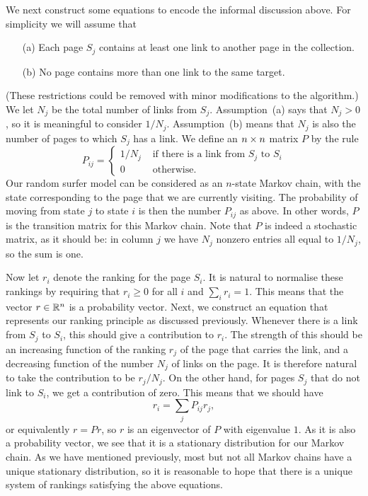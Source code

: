 \documentclass[reqno]{amsart}
\theoremstyle{definition}
\newcommand{\idx}[1]{{#1}\index{#1}}
\begin{document}
We next construct some equations to encode the informal discussion
above.  For simplicity we will assume that 
\begin{itemize}
 \item[(a)] Each page $S_j$ contains at least one link to another page
  in the collection.
 \item[(b)] No page contains more than one link to the same target.
\end{itemize}
(These restrictions could be removed with minor modifications to the
algorithm.)  We let $N_j$ be the total number of links from $S_j$.
Assumption~(a) says that $N_j>0$, so it is meaningful to consider
$1/N_j$.  Assumption~(b) means that $N_j$ is also the number of pages
to which $S_j$ has a link.  We define an $n\times n$ matrix $P$ by the
rule 
\[ P_{ij} = \begin{cases}
     1/N_j & \text{ if there is a link from $S_j$ to $S_i$} \\
     0     & \text{ otherwise. } 
   \end{cases}
\]
Our random surfer model can be considered as an $n$-state Markov
chain, with the state corresponding to the page that we are currently
visiting.  The probability of moving from state $j$ to state $i$ is
then the number $P_{ij}$ as above.  In other words, $P$ is the
\idx{transition matrix} 
for this Markov chain.  Note that $P$ is indeed a
stochastic matrix, as it should be: in column $j$ we have $N_j$
nonzero entries all equal to $1/N_j$, so the sum is one.

Now let $r_i$ denote the ranking for the page $S_i$.  It is natural to
normalise these rankings by requiring that $r_i\geq 0$ for all $i$ and
$\sum_ir_i=1$.  This means that the vector $r\in{\mathbb{R}}^n$ is a probability
vector.  Next, we construct an equation that represents our ranking
principle as discussed previously.  Whenever there is a link from
$S_j$ to $S_i$, this should give a contribution to $r_i$.  The
strength of this should be an increasing function of the ranking $r_j$
of the page that carries the link, and a decreasing function of the
number $N_j$ of links on the page.  It is therefore natural to take
the contribution to be $r_j/N_j$.  On the other hand, for pages $S_j$
that do not link to $S_i$, we get a contribution of zero.  This means
that we should have
\[ r_i = \sum_j P_{ij}r_j, \]
or equivalently $r=Pr$, so $r$ is an eigenvector of $P$ with
eigenvalue $1$.  As it is also a probability vector, we see that it is
a stationary distribution for our Markov chain.  As we have mentioned
previously, most but not all Markov chains have a unique stationary
distribution, so it is reasonable to hope that there is a unique
system of rankings satisfying the above equations.
\end{document}

